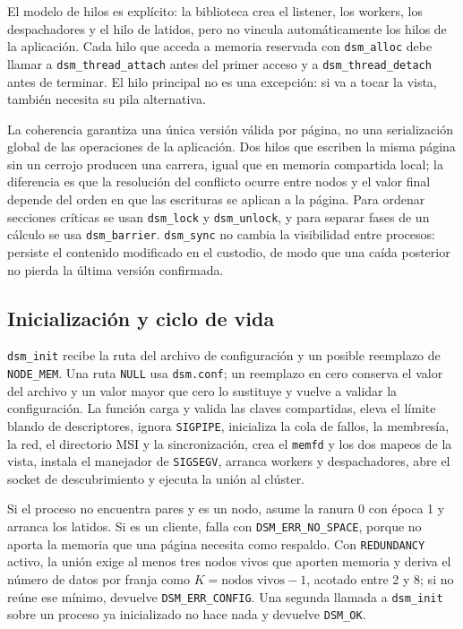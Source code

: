 El modelo de hilos es explícito: la biblioteca crea el listener, los workers, los despachadores y el hilo de latidos, pero no vincula automáticamente los hilos de la aplicación. Cada hilo que acceda a memoria reservada con \texttt{dsm\_alloc} debe llamar a \texttt{dsm\_thread\_attach} antes del primer acceso y a \texttt{dsm\_thread\_detach} antes de terminar. El hilo principal no es una excepción: si va a tocar la vista, también necesita su pila alternativa.

La coherencia garantiza una única versión válida por página, no una serialización global de las operaciones de la aplicación. Dos hilos que escriben la misma página sin un cerrojo producen una carrera, igual que en memoria compartida local; la diferencia es que la resolución del conflicto ocurre entre nodos y el valor final depende del orden en que las escrituras se aplican a la página. Para ordenar secciones críticas se usan \texttt{dsm\_lock} y \texttt{dsm\_unlock}, y para separar fases de un cálculo se usa \texttt{dsm\_barrier}. \texttt{dsm\_sync} no cambia la visibilidad entre procesos: persiste el contenido modificado en el custodio, de modo que una caída posterior no pierda la última versión confirmada.

\subsection{Inicialización y ciclo de vida}

\texttt{dsm\_init} recibe la ruta del archivo de configuración y un posible reemplazo de \texttt{NODE\_MEM}. Una ruta \texttt{NULL} usa \texttt{dsm.conf}; un reemplazo en cero conserva el valor del archivo y un valor mayor que cero lo sustituye y vuelve a validar la configuración. La función carga y valida las claves compartidas, eleva el límite blando de descriptores, ignora \texttt{SIGPIPE}, inicializa la cola de fallos, la membresía, la red, el directorio MSI y la sincronización, crea el \texttt{memfd} y los dos mapeos de la vista, instala el manejador de \texttt{SIGSEGV}, arranca workers y despachadores, abre el socket de descubrimiento y ejecuta la unión al clúster.

Si el proceso no encuentra pares y es un nodo, asume la ranura 0 con época 1 y arranca los latidos. Si es un cliente, falla con \texttt{DSM\_ERR\_NO\_SPACE}, porque no aporta la memoria que una página necesita como respaldo. Con \texttt{REDUNDANCY} activo, la unión exige al menos tres nodos vivos que aporten memoria y deriva el número de datos por franja como $K = \text{nodos vivos} - 1$, acotado entre 2 y 8; si no reúne ese mínimo, devuelve \texttt{DSM\_ERR\_CONFIG}. Una segunda llamada a \texttt{dsm\_init} sobre un proceso ya inicializado no hace nada y devuelve \texttt{DSM\_OK}.

